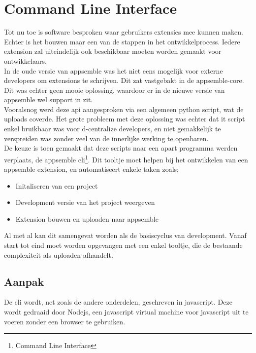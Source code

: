 \chapter{Command Line Interface}

Tot nu toe is software besproken waar gebruikers extensies mee kunnen maken. Echter is het bouwen maar een van de stappen in het ontwikkelprocess. Iedere extension zal uiteindelijk ook beschikbaar moeten worden gemaakt voor ontwikkelaars. \\

In de oude versie van appsemble was het niet eens mogelijk voor externe developers om extensions te schrijven. Dit zat vastgebakt in de appsemble-core. Dit was echter geen mooie oplossing, waardoor er in de nieuwe versie van appsemble wel support in zit. \\

Vooralsnog werd deze api aangesproken via een algemeen python script, wat de uploads coverde. Het grote probleem met deze oplossing was echter dat it script enkel bruikbaar was voor d-centralize developers, en niet gemakkelijk te verspreiden was zonder veel van de innerlijke werking te openbaren. \\

De keuze is toen gemaakt dat deze scripts naar een apart programma werden verplaats, de appsemble cli\footnote{Command Line Interface}. Dit tooltje moet helpen bij het ontwikkelen van een appsemble extension, en automatiseert enkele taken zoals;

\begin{itemize}
	\item Initaliseren van een project
	\item Development versie van het project weergeven
	\item Extension bouwen en uploaden naar appsemble
\end{itemize}

Al met al kan dit samengevat worden als de basiscyclus van development. Vanaf start tot eind moet worden opgevangen met een enkel tooltje, die de bestaande complexiteit als uploaden afhandelt.

\section{Aanpak}

De cli wordt, net zoals de andere onderdelen, geschreven in javascript. Deze wordt gedraaid door Nodejs, een javascript virtual machine voor javascript uit te voeren zonder een browser te gebruiken. \\

